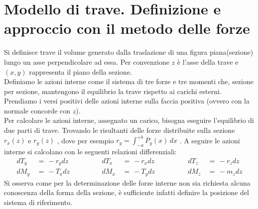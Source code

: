 \section{Modello di trave. Definizione e approccio con il metodo delle forze}

Si definisce trave il volume generato dalla traslazione di una figura piana(sezione) lungo un asse perpendicolare ad essa. Per convenzione $z$ è l'asse della trave e $(x,y)$ rappresenta il piano della sezione.\\
Definiamo le azioni interne come il sistema di tre forze e tre momenti che, sezione per sezione, mantengono il equilibrio la trave rispetto ai carichi esterni. Prendiamo i versi positivi delle azioni interne sulla faccia positiva (ovvero con la normale concorde con $z$).\\
Per calcolare le azioni interne, assegnato un carico, bisogna eseguire l'equilibrio di due parti di trave. Trovando le risultanti delle forze distribuite sulla sezione $r_x(z)$ e $r_y(z)$ , dove per esempio $r_y = \int_{-a}^{+b}P_y(x)\,dx$ . A seguire le azioni interne si calcolano con le seguenti relazioni differenziali:
\begin{align*}
    dT_y \, &=\, -r_ydz \quad \quad \quad\quad &dT_x \, &=\, -r_xdz \quad \quad \quad\quad &dT_z \, &=\, -r_zdz \\
    dM_y \, &=\, -T_xdz      &dM_x \, &=\, -T_ydz       &dM_z \, &=\, -m_zdz 
\end{align*}
Si osserva come per la determinazione delle forze interne non sia richiesta alcuna conoscenza della forma della sezione, è sufficiente infatti definire la posizione del sistema di riferimento.\\

